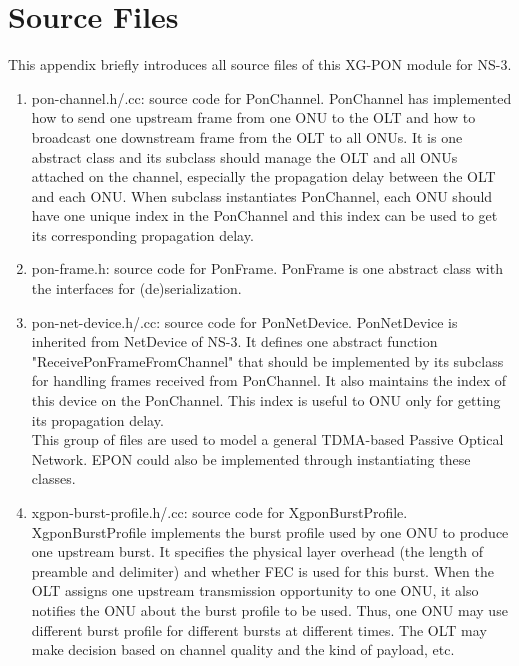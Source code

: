 \section{Source Files}
This appendix briefly introduces all source files of this XG-PON module for NS-3.

\begin{enumerate}
 \item pon-channel.h/.cc: source code for {\color{red} PonChannel}. 
PonChannel has implemented how to send one upstream frame from one ONU to the OLT 
and how to broadcast one downstream frame from the OLT to all ONUs. 
It is one abstract class and its subclass should manage the OLT and all ONUs 
attached on the channel, especially the propagation delay between the OLT and each ONU. 
When subclass instantiates PonChannel, each ONU should have one unique index in the PonChannel and this index can be used to get its corresponding propagation delay.

 \item pon-frame.h: source code for {\color{red} PonFrame}. 
PonFrame is one abstract class with the interfaces for (de)serialization.

 \item pon-net-device.h/.cc: source code for {\color{red} PonNetDevice}. 
PonNetDevice is inherited from NetDevice of NS-3. 
It defines one abstract function "ReceivePonFrameFromChannel" that 
should be implemented by its subclass for handling frames received from PonChannel. 
It also maintains the index of this device on the PonChannel. 
This index is useful to ONU only for getting its propagation delay.
\\
{\color{blue} This group of files are used to model a general 
TDMA-based Passive Optical Network. EPON could also be implemented 
through instantiating these classes.}
\vspace{0.3in}



 \item xgpon-burst-profile.h/.cc: source code for {\color{red} XgponBurstProfile}. 
XgponBurstProfile implements the burst profile used by one ONU to produce one upstream burst. 
It specifies the physical layer overhead (the length of preamble and delimiter) and 
whether FEC is used for this burst. When the OLT assigns one upstream transmission opportunity to one ONU, 
it also notifies the ONU about the burst profile to be used. Thus, one ONU may use different 
burst profile for different bursts at different times. 
The OLT may make decision based on channel quality and the kind of payload, etc.


\end{enumerate}
